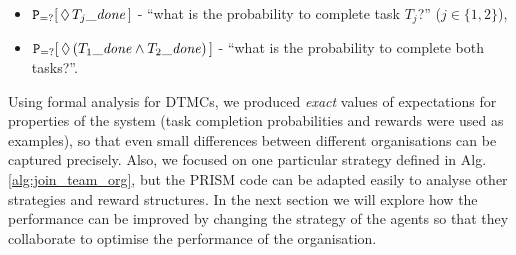 \documentclass{llncs}
\begin{document}
\begin{itemize}
 \item ${\tt P}_{=?}[\,\Diamond\,T_{j} \mathit{\_done}\,]$ -
``what is the probability to complete  task $T_j$?'' ($j\in\{1,2\}$),
 \item ${\tt P}_{=?}[\,\Diamond\,(T_{1} \mathit{\_done} \wedge T_2 \mathit{\_done})\,]$ -
``what is the probability to complete  both tasks?''. %
\end{itemize}
\begin{table}[t]
 \centering
{}
\caption{Task completion probabilities for optimal agent organisations using Alg.~\ref{alg:join_team_org}'s offline and online versions (see Alg.~\ref{alg:main_process}).}
\label{tab:task_compl_dtmc}
\end{table}
Using formal analysis for DTMCs, we produced \emph{exact} values of expectations for properties of the system (task completion probabilities and rewards were used as examples), so that even small differences between different organisations can be captured precisely. Also, we focused on one particular strategy defined in Alg. \ref{alg:join_team_org}, but the PRISM code can be adapted easily to analyse other strategies and reward structures. In the next section we will explore how the performance can be improved by changing the strategy of the agents so that they collaborate to optimise the performance of the organisation.
\end{document}
